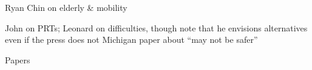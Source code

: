 Ryan Chin on elderly & mobility

John on PRTs; Leonard on difficulties, though note that he envisions
alternatives even if the press does not
Michigan paper about ``may not be safer''

Papers



